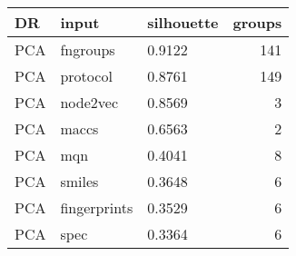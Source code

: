 \begin{tabular}{lllr}
\toprule
    DR &         input & silhouette &  groups \\
\midrule
PCA &      fngroups &     0.9122 &     141 \\
PCA &      protocol &     0.8761 &     149 \\
PCA &      node2vec &     0.8569 &       3 \\
PCA &         maccs &     0.6563 &       2 \\
PCA &           mqn &     0.4041 &       8 \\
PCA &        smiles &     0.3648 &       6 \\
PCA &  fingerprints &     0.3529 &       6 \\
PCA &          spec &     0.3364 &       6 \\
\bottomrule
\end{tabular}